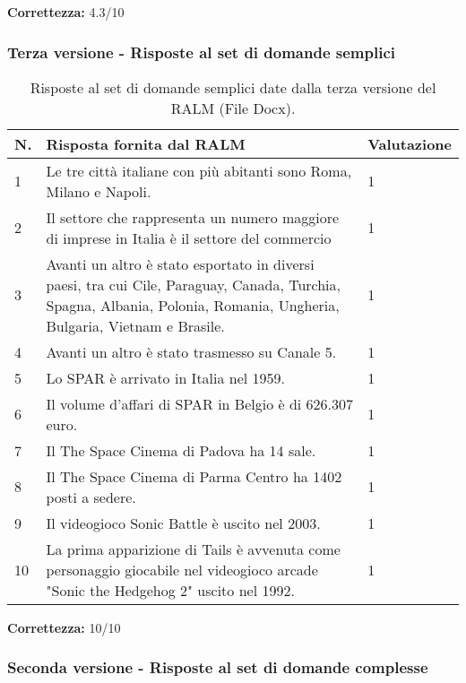 \textbf{Correttezza:} 4.3/10

\subsubsection{Terza versione - Risposte al set di domande semplici}

\begin{table}[H]
    \centering
    \begin{tabular}{|p{0.5cm} |p{6cm} |p{2cm}|}
        \hline
        \textbf{N}. & \textbf{Risposta fornita dal RALM} & \textbf{Valutazione} \\
        \hline
        1 & Le tre città italiane con più abitanti sono Roma, Milano e Napoli. & 1 \\
        \hline
        2 & Il settore che rappresenta un numero maggiore di imprese in Italia è il settore del commercio & 1 \\
        \hline
        3 & Avanti un altro è stato esportato in diversi paesi, tra cui Cile, Paraguay, Canada, Turchia, Spagna, Albania, Polonia, Romania, Ungheria, Bulgaria, Vietnam e Brasile. & 1 \\
        \hline
        4 & Avanti un altro è stato trasmesso su Canale 5. & 1 \\
        \hline
        5 & Lo SPAR è arrivato in Italia nel 1959. & 1 \\
        \hline
        6 & Il volume d'affari di SPAR in Belgio è di 626.307 euro. & 1 \\
        \hline
        7 & Il The Space Cinema di Padova ha 14 sale. & 1 \\
        \hline
        8 & Il The Space Cinema di Parma Centro ha 1402 posti a sedere. & 1 \\
        \hline
        9 & Il videogioco Sonic Battle è uscito nel 2003. & 1 \\
        \hline
        10 & La prima apparizione di Tails è avvenuta come personaggio giocabile nel videogioco arcade "Sonic the Hedgehog 2" uscito nel 1992. & 1 \\
        \hline
    \end{tabular}
    \caption{Risposte al set di domande semplici date dalla terza versione del RALM (File Docx).}
\end{table}

\textbf{Correttezza:} 10/10

\subsubsection{Seconda versione - Risposte al set di domande complesse}

